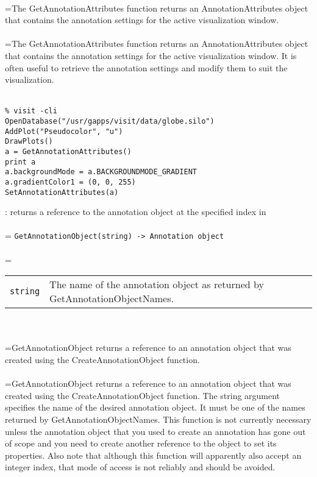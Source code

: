 \documentclass[10pt,a4paper]{report}
\begin{document}
 \\ 
\hangindent=\parindent The GetAnnotationAttributes function returns an AnnotationAttributes object that contains the annotation settings for the active visualization window. \\[-3mm] 

 \\ 
\hangindent=\parindent The GetAnnotationAttributes function returns an AnnotationAttributes object that contains the annotation settings for the active visualization window. It is often useful to retrieve the annotation settings and modify them to suit the visualization. \\[-3mm] 

\\[-6mm]
\begin{verbatim}% visit -cli
OpenDatabase("/usr/gapps/visit/data/globe.silo")
AddPlot("Pseudocolor", "u")
DrawPlots()
a = GetAnnotationAttributes()
print a
a.backgroundMode = a.BACKGROUNDMODE_GRADIENT
a.gradientColor1 = (0, 0, 255)
SetAnnotationAttributes(a)
\end{verbatim}
\newpage


{}
: returns a reference to the annotation object at the specified index in\\[-3mm]

 \\ 
\hangindent=\parindent 
\verb!GetAnnotationObject(string) -> Annotation object!\\ [-3mm]

 \\ 
\hangindent=\parindent 
\begin{tabular}{lp{9cm}}
\verb!string! & The name of the annotation object as returned by GetAnnotationObjectNames. \\
\end{tabular} \\[-2mm]


 \\ 
\hangindent=\parindent GetAnnotationObject returns a reference to an annotation object that was created using the CreateAnnotationObject function. \\[-3mm] 

 \\ 
\hangindent=\parindent GetAnnotationObject returns a reference to an annotation object that was created using the CreateAnnotationObject function. The string argument specifies the name of the desired annotation object. It must be one of the names returned by GetAnnotationObjectNames. This function is not currently necessary unless the annotation object that you used to create an annotation has gone out of scope and you need to create another reference to the object to set its properties. Also note that although this function will apparently also accept an integer index, that mode of access is not reliably and should be avoided. \\[-3mm] 
\end{document}
